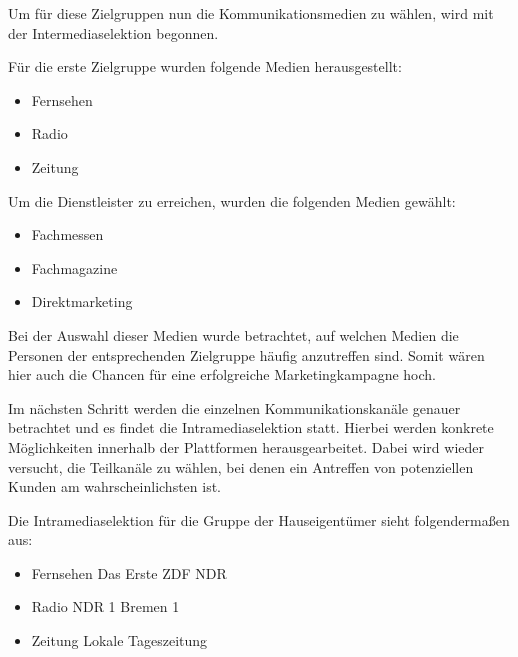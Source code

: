             \noindent Um für diese Zielgruppen nun die Kommunikationsmedien zu wählen, wird mit der Intermediaselektion begonnen.
            
            \noindent Für die erste Zielgruppe wurden folgende Medien herausgestellt:
        
                \begin{itemize}
                    \item Fernsehen
                    \item Radio
                    \item Zeitung
                \end{itemize}
        
            \noindent Um die Dienstleister zu erreichen, wurden die folgenden Medien gewählt: 
        
                \begin{itemize}
                    \item Fachmessen
                    \item Fachmagazine
                    \item Direktmarketing
                \end{itemize}
        
            \noindent
            Bei der Auswahl dieser Medien wurde betrachtet, auf welchen Medien die Personen der entsprechenden Zielgruppe häufig
            anzutreffen sind. Somit wären hier auch die Chancen für eine erfolgreiche Marketingkampagne hoch.
        
            \noindent
            Im nächsten Schritt werden die einzelnen Kommunikationskanäle genauer betrachtet und es findet die
            Intramediaselektion statt. Hierbei werden konkrete Möglichkeiten innerhalb der Plattformen herausgearbeitet. Dabei
            wird wieder versucht, die Teilkanäle zu wählen, bei denen ein Antreffen von potenziellen Kunden am
            wahrscheinlichsten ist.
        
            \noindent
            Die Intramediaselektion für die Gruppe der Hauseigentümer sieht folgendermaßen aus:
        
            \begin{itemize}
                \item Fernsehen
                    \subitem Das Erste
                    \subitem ZDF
                    \subitem NDR
                \item Radio
                    \subitem NDR 1
                    \subitem Bremen 1
                \item Zeitung
                    \subitem Lokale Tageszeitung
            \end{itemize}
        
